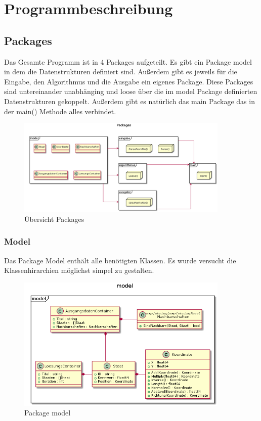 \chapter{Programmbeschreibung}
\label{chap:Programmbeschreibung}

\section{Packages}

Das Gesamte Programm ist in 4 Packages aufgeteilt. Es gibt ein Package model in dem die Datenstrukturen definiert sind.
Außerdem gibt es jeweils für die Eingabe, den Algorithmus und die Ausgabe ein eigenes Package.
Diese Packages sind untereinander unabhänging und loose über die im model Package definierten Datenstrukturen gekoppelt.
Außerdem gibt es natürlich das main Package das in der main() Methode alles verbindet.

\begin{figure}[h]
    \centering
    \includegraphics[width=0.9\textwidth,]{packages.png}
    \caption[]{Übersicht Packages}
\end{figure}

\subsection{Model}

Das Package Model enthält alle benötigten Klassen. Es wurde versucht die Klassenhirarchien möglichst simpel zu gestalten.

\begin{figure}[ht]
    \centering
    \includegraphics[width=0.9\textwidth,]{model.png}
    \caption[]{Package model}
\end{figure}

